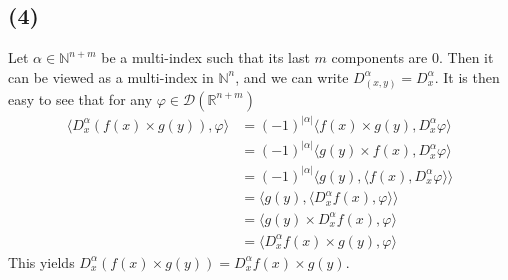 \documentclass[11pt,a4paper]{article}
\newcommand{\ph}{\varphi}
\newcommand{\N}{\mathbb{N}}
\newcommand{\R}{\mathbb{R}}
\newcommand{\1}{\mathbbm{1}}
\begin{document}
\subsection*{(4)}
Let $\alpha \in \N^{n+m}$ be a multi-index such that its last $m$ components are $0$. Then it can be viewed as a multi-index in $\N^n$, and we can write $D^\alpha_{(x,y)} = D^\alpha_x$. It is then easy to see that for any $\ph \in \mathcal{D}(\R^{n+m})$
\begin{align*}
\langle D^\alpha_x (f(x) \times g(y)) , \ph \rangle
& = (-1)^{|\alpha|} \langle f(x) \times g(y) , D^\alpha_x \ph \rangle \\
& = (-1)^{|\alpha|} \langle g(y) \times f(x) , D^\alpha_x \ph \rangle \\
& = (-1)^{|\alpha|} \langle g(y) , \langle f(x) , D^\alpha_x \ph \rangle \rangle \\
& = \langle g(y) , \langle D^\alpha_x f(x) , \ph \rangle \rangle \\
& = \langle g(y) \times D^\alpha_x f(x) , \ph \rangle \\
& = \langle D^\alpha_x f(x) \times g(y) , \ph \rangle 
\end{align*} 
This yields $D^\alpha_x (f(x) \times g(y)) = D^\alpha_x f(x) \times g(y)$.
\end{document}

